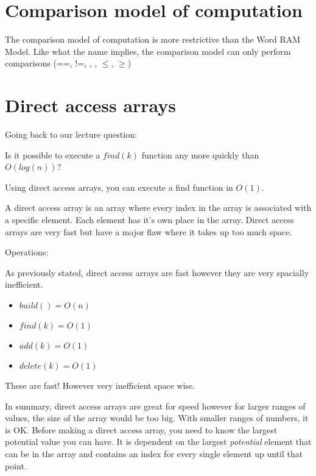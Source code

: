 \documentclass[11pt,a4paper,english]{paper}
\begin{document}
\section{Comparison model of computation}

The comparison model of computation is more restrictive than the Word RAM Model. Like what the name implies, the comparison model can only perform comparisons (==, !=, , , $\leq$, $\geq$)

\section{Direct access arrays}

Going back to our lecture question: 

\begin{gbox}{}{
    Is it possible to execute a $find(k)$ function any more quickly than $O(log(n))$?
}\end{gbox}

\noindent Using direct access arrays, you can execute a find function in $O(1)$.

\noindent A direct access array is an array where every index in the array is associated with a specific element. Each element has it's own place in the array. Direct access arrays are very fast but have a major flaw where it takes up too much space.

\bigskip
\begin{bluebox}{Operations:} {

    As previously stated, direct access arrays are fast however they are very spacially inefficient.

    \begin{itemize}

    \item $build() = O(n)$
    \item $find(k) = O(1)$
    \item $add(k) = O(1)$
    \item $delete(k) = O(1)$

    \end{itemize}

    These are fast! However very inefficient space wise.


}\end{bluebox}

\bigskip
\noindent
In summary, direct access arrays are great for speed however for larger ranges of values, the size of the array would be too big. With smaller ranges of numbers, it is OK. Before making a direct access array, you need to know the largest potential value you can have. It is dependent on the largest \textit{potential} element that can be in the array and contains an index for every single element up until that point.
\end{document}
